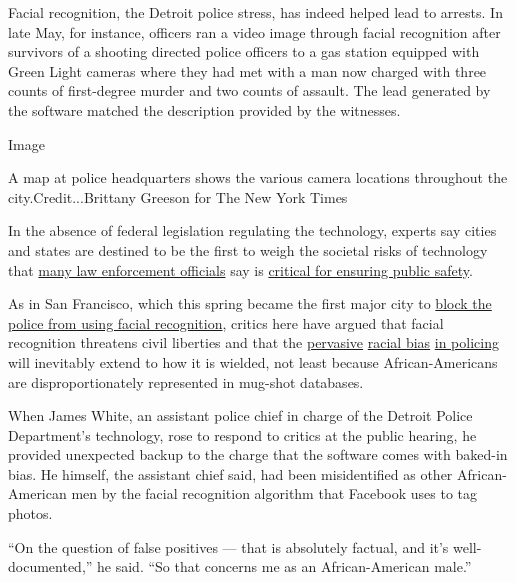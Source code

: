 Facial recognition, the Detroit police stress, has indeed helped lead to
arrests. In late May, for instance, officers ran a video image through
facial recognition after survivors of a shooting directed police
officers to a gas station equipped with Green Light cameras where they
had met with a man now charged with three counts of first-degree murder
and two counts of assault. The lead generated by the software matched
the description provided by the witnesses.

Image

A map at police headquarters shows the various camera locations
throughout the city.Credit...Brittany Greeson for The New York Times

In the absence of federal legislation regulating the technology, experts
say cities and states are destined to be the first to weigh the societal
risks of technology that
\href{https://www.nytimes.com/2019/05/18/us/facial-recognition-police.html}{many
law enforcement officials} say is
\href{https://www.nytimes.com/2019/06/09/opinion/facial-recognition-police-new-york-city.html}{critical
for ensuring public safety}.

As in San Francisco, which this spring became the first major city to
\href{https://www.nytimes.com/2019/07/01/us/facial-recognition-san-francisco.html}{block
the police from using facial recognition}, critics here have argued that
facial recognition threatens civil liberties and that the
\href{https://www.bjs.gov/content/pub/pdf/cpp15.pdf}{pervasive}
\href{https://www.detroitnews.com/story/news/local/detroit-city/2019/04/24/detroit-police-chief-cites-racially-tone-deaf-culture-6th-precinct/3554141002/}{racial
bias}
\href{https://www.washingtonpost.com/news/opinions/wp/2018/09/18/theres-overwhelming-evidence-that-the-criminal-justice-system-is-racist-heres-the-proof/?utm_term=.01ee3c3c5895}{in
policing} will inevitably extend to how it is wielded, not least because
African-Americans are disproportionately represented in mug-shot
databases.

When James White, an assistant police chief in charge of the Detroit
Police Department's technology, rose to respond to critics at the public
hearing, he provided unexpected backup to the charge that the software
comes with baked-in bias. He himself, the assistant chief said, had been
misidentified as other African-American men by the facial recognition
algorithm that Facebook uses to tag photos.

``On the question of false positives --- that is absolutely factual, and
it's well-documented,'' he said. ``So that concerns me as an
African-American male.''

